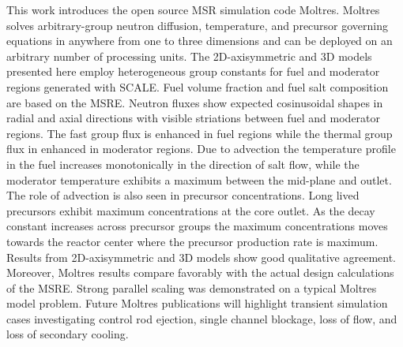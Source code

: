 \documentclass{article}
\begin{document}
This work introduces the open source \gls{MSR} simulation code Moltres. Moltres
solves arbitrary-group neutron diffusion, temperature, and precursor governing
equations in anywhere from one to three dimensions and can be deployed on an
arbitrary number of processing units. The 2D-axisymmetric and 3D models
presented here employ heterogeneous group constants for fuel and moderator
regions generated with SCALE. Fuel volume fraction and fuel salt composition are
based on the \gls{MSRE}. Neutron fluxes show expected cosinusoidal shapes in
radial and axial directions with visible striations between fuel and moderator
regions. The fast group flux is enhanced in fuel regions while the thermal group
flux in enhanced in moderator regions. Due to advection the temperature profile
in the fuel increases monotonically in the direction of salt flow, while the
moderator temperature exhibits a maximum between the mid-plane and outlet. The
role of advection is also seen in precursor concentrations. Long lived
precursors exhibit maximum concentrations at the core outlet. As the decay
constant increases across precursor groups the maximum concentrations moves
towards the reactor center where the precursor production rate is
maximum. Results from 2D-axisymmetric and 3D models show good qualitative
agreement. Moreover, Moltres results compare favorably with the actual design
calculations of the \gls{MSRE}. Strong parallel scaling was demonstrated on a
typical Moltres model problem. Future Moltres publications will highlight
transient simulation cases investigating control rod ejection, single channel
blockage, loss of flow, and loss of secondary cooling.

\FloatBarrier
\clearpage
\printglossary[type=\acronymtype]


\end{document}
